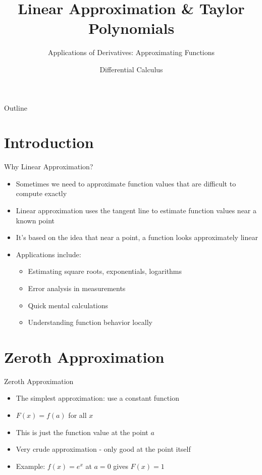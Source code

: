 \documentclass[aspectratio=169]{beamer}
\title{Linear Approximation \& Taylor Polynomials}
\subtitle{Applications of Derivatives: Approximating Functions}
\author{Differential Calculus}
\date{}
\begin{document}
\begin{frame}
\titlepage
\end{frame}

\begin{frame}{Outline}
\tableofcontents
\end{frame}

\section{Introduction}

\begin{frame}{Why Linear Approximation?}
\begin{itemize}
    \item Sometimes we need to approximate function values that are difficult to compute exactly
    \item Linear approximation uses the tangent line to estimate function values near a known point
    \item It's based on the idea that near a point, a function looks approximately linear
    \item Applications include:
    \begin{itemize}
        \item Estimating square roots, exponentials, logarithms
        \item Error analysis in measurements
        \item Quick mental calculations
        \item Understanding function behavior locally
    \end{itemize}
\end{itemize}
\end{frame}

\section{Zeroth Approximation}

\begin{frame}{Zeroth Approximation}
\begin{itemize}
    \item The simplest approximation: use a constant function
    \item $F(x) = f(a)$ for all $x$
    \item This is just the function value at the point $a$
    \item Very crude approximation - only good at the point itself
    \item Example: $f(x) = e^x$ at $a = 0$ gives $F(x) = 1$
\end{itemize}
\end{frame}
\end{document}

